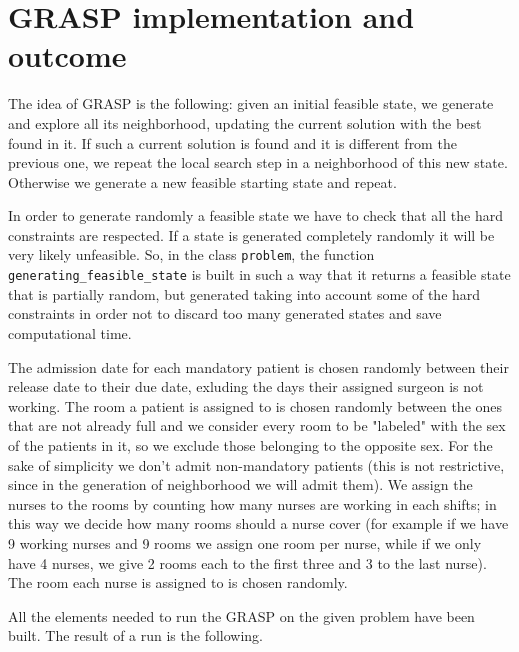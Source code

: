 \documentclass{article}
\begin{document}
\section{GRASP implementation and outcome}
The idea of GRASP is the following: given an initial feasible state, we generate and explore all its neighborhood,
updating the current solution with the best found in it. If such a current solution is found and it is different from the previous one, 
we repeat the local search step in a neighborhood of this new state. Otherwise we generate a new feasible starting state and repeat.

In order to generate randomly a feasible state we have to check that all the hard constraints are respected. If a state is generated 
completely randomly it will be very likely unfeasible. So, in the class \texttt{problem}, the function \texttt{generating\_feasible\_state} 
is built in such a way that it returns a feasible state that is partially random, but generated taking into account some of the hard constraints 
in order not to discard too many generated states and save computational time.

The admission date for each mandatory patient is chosen randomly between their release date to their due date, exluding the days their assigned surgeon 
is not working. The room a patient is assigned to is chosen randomly between the ones that are not already full and we consider every room to be "labeled" with the sex 
of the patients in it, so we exclude those belonging to the opposite sex. For the sake of simplicity we don't admit non-mandatory patients (this is not restrictive, since 
in the generation of neighborhood we will admit them). We assign the nurses to the rooms by counting how many nurses are working in each shifts; in this way we decide 
how many rooms should a nurse cover (for example if we have 9 working nurses and 9 rooms we assign one room per nurse, while if we only have 4 nurses, we give 2 rooms each to 
the first three and 3 to the last nurse). The room each nurse is assigned to is chosen randomly.

All the elements needed to run the GRASP on the given problem have been built. The result of a run 
is the following.
\end{document}
